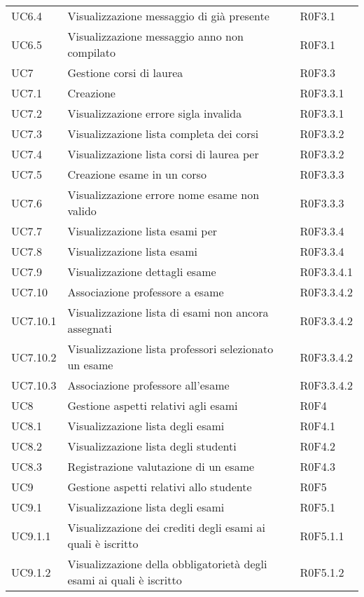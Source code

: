 \documentclass[AnalisiDeiRequisiti.tex]{subfiles}
\begin{document}
\begin{longtable}[H]{p{2cm}p{5cm}p{5cm}}
	UC6.4 & Visualizzazione messaggio di \citGloss{anno accademico} già presente & R0F3.1 \\  
	UC6.5 & Visualizzazione messaggio anno non compilato &  R0F3.1 \\  
	UC7 & Gestione corsi di laurea &  R0F3.3 \\   
	UC7.1 & Creazione \citGloss{corso di laurea} &  R0F3.3.1 \\  
	UC7.2 & Visualizzazione errore sigla invalida & R0F3.3.1 \\  
	UC7.3 & Visualizzazione lista completa dei corsi &  R0F3.3.2 \\  
	UC7.4 & Visualizzazione lista corsi di laurea per \citGloss{anno accademico} & R0F3.3.2  \\  
	UC7.5 & Creazione esame in un corso &  R0F3.3.3\\  
	UC7.6 & Visualizzazione errore nome esame non valido & R0F3.3.3  \\  
	UC7.7 & Visualizzazione lista esami per \citGloss{corso di laurea} & R0F3.3.4 \\  
	UC7.8 & Visualizzazione lista esami &  R0F3.3.4 \\  
	UC7.9 & Visualizzazione dettagli esame & R0F3.3.4.1 \\  
	UC7.10 & Associazione professore a esame & R0F3.3.4.2 \\
	UC7.10.1 & Visualizzazione lista di esami non ancora assegnati & R0F3.3.4.2 \\ 
	UC7.10.2 & Visualizzazione lista professori selezionato un esame & R0F3.3.4.2 \\ 
	UC7.10.3 & Associazione professore all'esame & R0F3.3.4.2 \\ 
	UC8 & Gestione aspetti relativi agli esami & R0F4 \\  
	UC8.1 & Visualizzazione lista degli esami & R0F4.1 \\  
	UC8.2 & Visualizzazione lista degli studenti & R0F4.2  \\  
	UC8.3 & Registrazione valutazione di un esame & R0F4.3 \\  
	UC9 & Gestione aspetti relativi allo studente & R0F5 \\  
	UC9.1 & Visualizzazione lista degli esami & R0F5.1 \\  
	UC9.1.1 & Visualizzazione dei crediti degli esami ai quali è iscritto & R0F5.1.1 \\  
	UC9.1.2 & Visualizzazione della obbligatorietà degli esami ai quali è iscritto & R0F5.1.2 \\  

\end{longtable}
\end{document}
